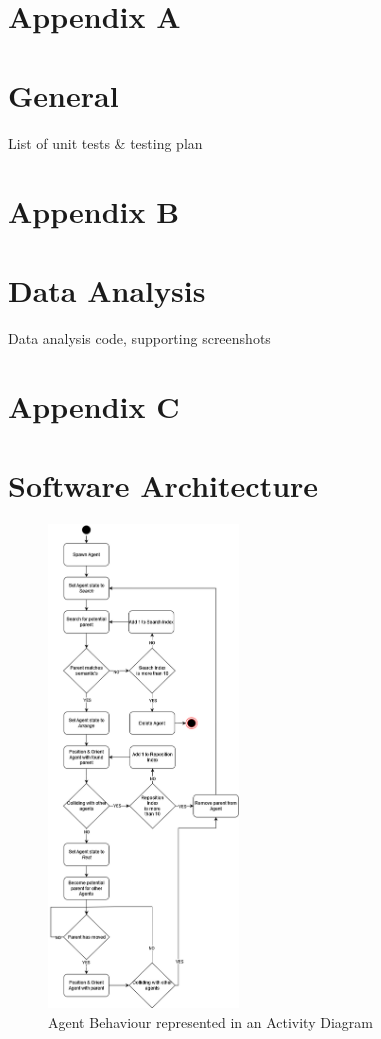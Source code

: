 \section*{Appendix A}
\section*{General}
\label{append:a}
List of unit tests \& testing plan

\section*{Appendix B}
\section*{Data Analysis}
\label{append:b}
Data analysis code, supporting screenshots

\newpage
\section*{Appendix C}
\section*{Software Architecture}
\label{append:c}
\begin{figure}[ht]
    \label{activity-diagram}
    \includegraphics[width=0.45\textwidth]{./Images/AgentActivityDiagram.png}
    \centering
    \caption{Agent Behaviour represented in an Activity Diagram}
\end{figure}
